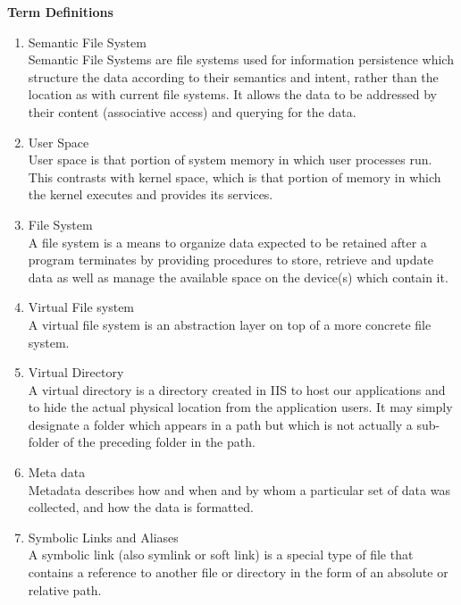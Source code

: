\noindent \textbf{Term Definitions} \\
\begin{enumerate}
\item Semantic File System \\
Semantic File Systems are file systems used for information persistence which structure the data according to their semantics and intent, rather than the location as with current file systems. It allows the data to be addressed by their content (associative access) and querying for the data.
\item User Space \\
User space is that portion of system memory in which user processes run. This contrasts with kernel space, which is that portion of memory in which the kernel executes and provides its services.
\item File System \\
A 
file system 
is a 
means to 
organize 
data 
expected to be retained after a program 
terminates by providing procedures to store, retrieve and update data as well as 
manage the available space on the device(s) which contain it. 
\item Virtual File system \\
A virtual file system is an abstraction layer on top of a more concrete file system.
\item Virtual Directory \\
A virtual directory is a directory created in IIS to host our applications and to hide the actual physical location from the application users. 
It may simply designate a folder which appears in a path but which is not actually a sub-folder of the preceding folder in the path. 
\item Meta data \\
Metadata describes how and when and by whom a particular set of data was collected, and how the data is formatted.
\item Symbolic Links and Aliases \\
A symbolic link (also symlink or soft link) is a special type of file that contains a reference to another file or directory in the form of an absolute or relative path. 


\end{enumerate}


